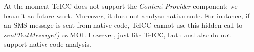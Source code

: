 At the moment TeICC does not support the \emph{Content Provider} component; we leave it as future work. Moreover, it does not analyze native code. For instance, if an SMS message is sent from native code, TeICC cannot use this hidden call to \emph{sentTextMessage()} as MOI. However, just like TeICC, both \cite{rasthofer2016harvesting} and \cite{backes2016r} also do not support native code analysis.





